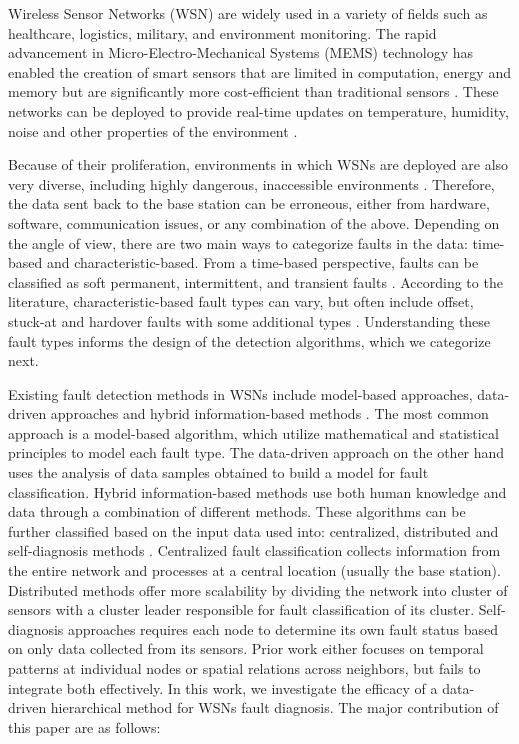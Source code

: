Wireless Sensor Networks (WSN) are widely used in a variety of fields such as healthcare, logistics, military, and environment monitoring. The rapid advancement in Micro-Electro-Mechanical Systems (MEMS) technology has enabled the creation of smart sensors that are limited in computation, energy and memory but are significantly more cost-efficient than traditional sensors \cite{Yick2008, Chai2020, Hussain2021}. These networks can be deployed to provide real-time updates on temperature, humidity, noise and other properties of the environment \cite{Yick2008, Chai2020, Ullo2020}.

Because of their proliferation, environments in which WSNs are deployed are also very diverse, including highly dangerous, inaccessible environments \cite{Prasad2023}. Therefore, the data sent back to the base station can be erroneous, either from hardware, software, communication issues, or any combination of the above. Depending on the angle of view, there are two main ways to categorize faults in the data: time-based and characteristic-based. From a time-based perspective, faults can be classified as soft permanent, intermittent, and transient faults \cite{Prasad2023}. According to the literature, characteristic-based fault types can vary, but often include offset, stuck-at and hardover faults with some additional types \cite{Shi2024,Saeed2021, Ni2009}. Understanding these fault types informs the design of the detection algorithms, which we categorize next.

Existing fault detection methods in WSNs include model-based approaches, data-driven approaches and hybrid information-based methods \cite{Shi2024}. The most common approach is a model-based algorithm, which utilize mathematical and statistical principles to model each fault type. The data-driven approach on the other hand uses the analysis of data samples obtained to build a model for fault classification. Hybrid information-based methods use both human knowledge and data through a combination of different methods. These algorithms can be further classified based on the input data used into: centralized, distributed and self-diagnosis methods \cite{Prasad2023, Takele2024}. Centralized fault classification collects information from the entire network and processes at a central location (usually the base station). Distributed methods offer more scalability by dividing the network into cluster of sensors with a cluster leader responsible for fault classification of its cluster. Self-diagnosis approaches requires each node to determine its own fault status based on only data collected from its sensors. Prior work either focuses on temporal patterns at individual nodes or spatial relations across neighbors, but fails to integrate both effectively. In this work, we investigate the efficacy of a data-driven hierarchical method for WSNs fault diagnosis. The major contribution of this paper are as follows:

